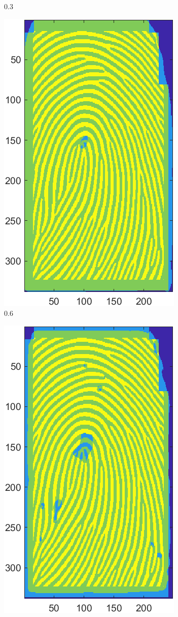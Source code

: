 \documentclass[a4paper]{article}
\begin{document}
\begin{figure}[h!]
\begin{subfigure}[t]{0.2\textwidth}
         \caption{\(0.3\)}
     \end{subfigure}
     \begin{subfigure}[t]{0.2\textwidth}
      \centering
      \includegraphics[scale=0.5]{Figures/E4-e1-0.6}
      \caption{\(0.6\)}
  \end{subfigure}%
  \quad
  \begin{subfigure}[t]{0.2\textwidth}
      \centering
      \includegraphics[scale=0.5]{Figures/E4-e1-0.9}

\end{subfigure}
\end{figure}
\end{document}
